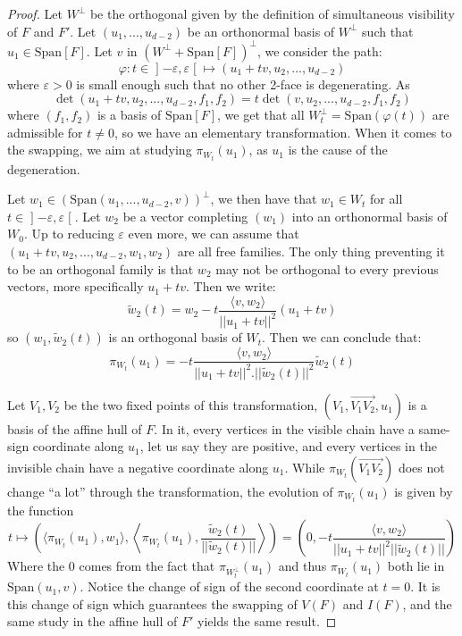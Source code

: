 \documentclass[12pt, notitlepage]{article}
\theoremstyle{plain}
\theoremstyle{definition}
\theoremstyle{plain}
\theoremstyle{remark}
\theoremstyle{plain}
\theoremstyle{plain}
\newcommand{\vect}{\text{Span}}
\begin{document}
\begin{proof}
    Let $W^\perp$ be the orthogonal given by the definition of simultaneous visibility of $F$ and $F'$. Let $(u_1,...,u_{d-2})$ be an orthonormal basis of $W^\perp$ such that $u_1\in \vect[F]$. Let $v$ in $(W^\perp + \vect[F])^\perp$, we consider the path: \[ \varphi : t\in \mathopen] -\varepsilon,\varepsilon\mathclose[ \mapsto (u_1+tv,u_2,...,u_{d-2}) \] where $\varepsilon>0$ is small enough such that no other 2-face is degenerating. As \[\det(u_1+tv,u_2,...,u_{d-2},f_1,f_2) = t\det(v,u_2,...,u_{d-2},f_1,f_2)\] where $(f_1,f_2)$ is a basis of $\vect[F]$, we get that all $W_t^\perp = \vect(\varphi(t))$ are admissible for $t\neq 0$, so we have an elementary transformation. When it comes to the swapping, we aim at studying $\pi_{W_t}(u_1)$, as $u_1$ is the cause of the degeneration.
    
    Let $w_1 \in (\vect(u_1,... ,u_{d-2},v))^\perp$, we then have that $w_1\in W_t$ for all $t\in\mathopen] -\varepsilon,\varepsilon\mathclose[$. Let $w_2$ be a vector completing $(w_1)$ into an orthonormal basis of $W_0$. Up to reducing $\varepsilon$ even more, we can assume that $(u_1+tv,u_2,...,u_{d-2},w_1,w_2)$ are all free families. The only thing preventing it to be an orthogonal family is that $w_2$ may not be orthogonal to every previous vectors, more specifically $u_1+tv$. Then we write: \[ \tilde w_2(t) = w_2- t\frac{\langle v,w_2 \rangle}{||u_1+tv||^2}(u_1+tv) \] so $(w_1,\tilde w_2(t))$ is an orthogonal basis of $W_t$. Then we can conclude that: \[ \pi_{W_t}(u_1) = -t\frac{\langle v,w_2 \rangle}{||u_1+tv||^2.||\tilde w_2(t)||^2}\tilde w_2(t) \]
    
    Let $V_1,V_2$ be the two fixed points of this transformation, $(V_1,\overrightarrow{V_1V_2},u_1)$ is a basis of the affine hull of $F$. In it, every vertices in the visible chain have a same-sign coordinate along $u_1$, let us say they are positive, and every vertices in the invisible chain have a negative coordinate along $u_1$. While $\pi_{W_t}(\overrightarrow{V_1V_2})$ does not change “a lot” through the transformation, the evolution of $\pi_{W_t}(u_1)$ is given by the function \[ t\mapsto \left(\langle\pi_{W_t}(u_1),w_1\rangle,\left\langle\pi_{W_t}(u_1),\frac{\tilde w_2(t)}{||\tilde w_2(t)||}\right\rangle\right) = \left(0, -t\frac{\langle v,w_2 \rangle}{||u_1+tv||^2||\tilde w_2(t)||} \right) \] Where the 0 comes from the fact that $\pi_{W^\perp_t}(u_1)$ and thus $\pi_{W_t}(u_1)$ both lie in $\vect(u_1,v)$. Notice the change of sign of the second coordinate at $t=0$. It is this change of sign which guarantees the swapping of $V(F)$ and $I(F)$, and the same study in the affine hull of $F'$ yields the same result.
\end{proof}
\end{document}
